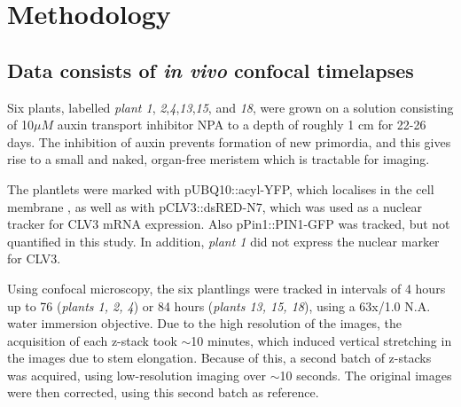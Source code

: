 
\chapter{Methodology}

\ifpdf
\graphicspath{{Chapter2/Figs/Raster/}{Chapter2/Figs/PDF/}{Chapter2/Figs/}}
\else
\graphicspath{{Chapter2/Figs/Vector/}{Chapter2/Figs/}}
\fi

\section[Raw data]{Data consists of \textit{in vivo} confocal timelapses}
Six plants, labelled \textit{plant 1},
\textit{2},\textit{4},\textit{13},\textit{15}, and \textit{18}, were grown on a
solution consisting of 10$\mu M$ auxin transport inhibitor NPA to a depth of
roughly 1 cm for 22-26 days. The inhibition of auxin prevents formation of new
primordia, and this gives rise to a small and naked, organ-free meristem which is
tractable for imaging. 

The plantlets were marked with pUBQ10::acyl-YFP, which localises in the cell
membrane \CITE, as well as with pCLV3::dsRED-N7, which was used as a nuclear tracker
for CLV3 mRNA expression. Also pPin1::PIN1-GFP was tracked, but not quantified
in this study. In addition, \textit{plant 1} did not express the nuclear marker
for CLV3.

Using confocal microscopy, the six plantlings were tracked in
intervals of 4 hours up to 76 (\textit{plants 1, 2, 4}) or 84 hours
(\textit{plants 13, 15, 18}), using a 63x/1.0 N.A. water immersion objective.
Due to the high resolution of the images, the acquisition of each z-stack took
$\sim$10 minutes, which induced vertical stretching in the images due to stem
elongation. Because of this, a second batch of z-stacks was acquired, using
low-resolution imaging over $\sim$10 seconds. The original images were then
corrected, using this second batch as reference. \CITE 

